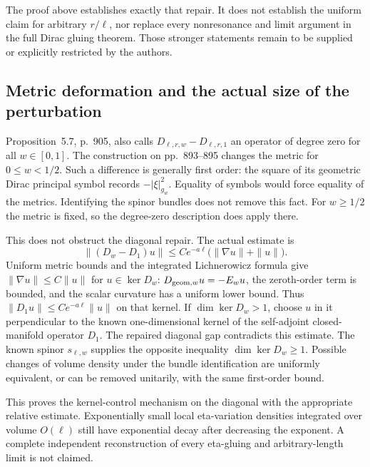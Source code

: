 \documentclass[10pt]{article}
\begin{document}
The proof above establishes exactly that repair. It does not establish the uniform claim for arbitrary \(r/\ell\), nor replace every nonresonance and limit argument in the full Dirac gluing theorem. Those stronger statements remain to be supplied or explicitly restricted by the authors.\par
\subsection*{Metric deformation and the actual size of the perturbation}
Proposition 5.7, p. 905, also calls \(D_{\ell,r,w}-D_{\ell,r,1}\) an operator of degree zero for all \(w\in[0,1]\). The construction on pp. 893–895 changes the metric for \(0\leq w<1/2\). Such a difference is generally first order: the square of its geometric Dirac principal symbol records \(-|\xi|_{g_w}^2\). Equality of symbols would force equality of the metrics. Identifying the spinor bundles does not remove this fact. For \(w\geq1/2\) the metric is fixed, so the degree-zero description does apply there.\par
This does not obstruct the diagonal repair. The actual estimate is \[\|(D_w-D_1)u\|
 \leq C e^{-a\ell}\bigl(\|\nabla u\|+\|u\|\bigr).\] Uniform metric bounds and the integrated Lichnerowicz formula give \(\|\nabla u\|\leq C\|u\|\) for \(u\in\ker D_w\): \(D_{{\rm geom},w}u=-E_wu\), the zeroth-order term is bounded, and the scalar curvature has a uniform lower bound. Thus \(\|D_1u\|\leq C e^{-a\ell}\|u\|\) on that kernel. If \(\dim\ker D_w>1\), choose \(u\) in it perpendicular to the known one-dimensional kernel of the self-adjoint closed-manifold operator \(D_1\). The repaired diagonal gap contradicts this estimate. The known spinor \(s_{\ell,w}\) supplies the opposite inequality \(\dim\ker D_w\geq1\). Possible changes of volume density under the bundle identification are uniformly equivalent, or can be removed unitarily, with the same first-order bound.\par
This proves the kernel-control mechanism on the diagonal with the appropriate relative estimate. Exponentially small local eta-variation densities integrated over volume \(O(\ell)\) still have exponential decay after decreasing the exponent. A complete independent reconstruction of every eta-gluing and arbitrary-length limit is not claimed.\par
\end{document}
